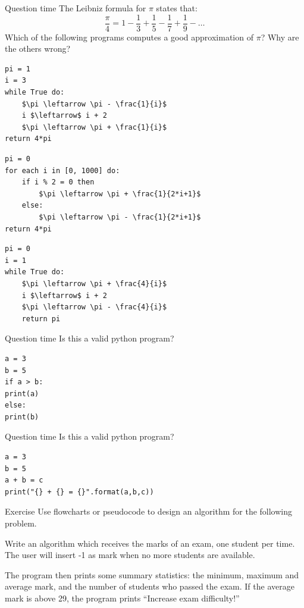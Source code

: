 \documentclass[aspectratio=169,]{beamer}
\begin{document}
\begin{frame}[fragile]{Question time}
    The Leibniz formula for $\pi$ states that:
    \[ \frac{\pi}{4} = 1 - \frac{1}{3} + \frac{1}{5} - \frac{1}{7} + \frac{1}{9} - \ldots \]
    Which of the following programs computes a good approximation of $\pi$?
    Why are the others wrong?

    \begin{minipage}{0.25\textwidth}
        \begin{lstlisting}[style=pseudo]
pi = 1
i = 3
while True do:
    $\pi \leftarrow \pi - \frac{1}{i}$
    i $\leftarrow$ i + 2
    $\pi \leftarrow \pi + \frac{1}{i}$
return 4*pi
        \end{lstlisting}
    \end{minipage}
    \begin{minipage}{0.4\textwidth}
        \begin{lstlisting}[style=pseudo]
pi = 0
for each i in [0, 1000] do:
    if i % 2 = 0 then
        $\pi \leftarrow \pi + \frac{1}{2*i+1}$
    else:
        $\pi \leftarrow \pi - \frac{1}{2*i+1}$
return 4*pi
        \end{lstlisting}
    \end{minipage}
    \begin{minipage}{0.2\textwidth}
        \begin{lstlisting}[style=pseudo]
pi = 0
i = 1
while True do:
    $\pi \leftarrow \pi + \frac{4}{i}$
    i $\leftarrow$ i + 2
    $\pi \leftarrow \pi - \frac{4}{i}$
    return pi
        \end{lstlisting}
    \end{minipage}
\end{frame}

\begin{frame}[fragile]{Question time}
    Is this a valid python program?
    \begin{verbatim}
a = 3
b = 5
if a > b:
print(a)
else:
print(b)
\end{verbatim}
\end{frame}

\begin{frame}[fragile]{Question time}
    Is this a valid python program?
    \begin{verbatim}
a = 3
b = 5
a + b = c
print("{} + {} = {}".format(a,b,c))
\end{verbatim}
\end{frame}

\begin{frame}{Exercise}
    Use flowcharts or pseudocode to design an algorithm for the following problem.

    Write an algorithm which receives the marks of an exam, one student per time.
    The user will insert -1 as mark when no more students are available.

    The program then prints some summary statistics: the minimum, maximum and average mark, and the number of students
    who passed the exam.
    If the average mark is above 29, the program prints ``Increase exam difficulty!''
\end{frame}
\end{document}

